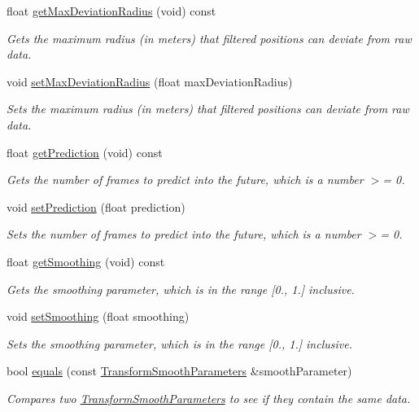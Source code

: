 \begin{DoxyCompactItemize}
float \hyperlink{class_transform_smooth_parameters_a6b09f5bd048295602203c150850adf10}{get\-Max\-Deviation\-Radius} (void) const 
\begin{DoxyCompactList}\small\item\em \-Gets the maximum radius (in meters) that filtered positions can deviate from raw data. \end{DoxyCompactList}\item 
void \hyperlink{class_transform_smooth_parameters_af60738964718dfef02ece5348e14c643}{set\-Max\-Deviation\-Radius} (float max\-Deviation\-Radius)
\begin{DoxyCompactList}\small\item\em \-Sets the maximum radius (in meters) that filtered positions can deviate from raw data. \end{DoxyCompactList}\item 
float \hyperlink{class_transform_smooth_parameters_aa2b0ade446dbda673507143b62441d95}{get\-Prediction} (void) const 
\begin{DoxyCompactList}\small\item\em \-Gets the number of frames to predict into the future, which is a number $>$= 0. \end{DoxyCompactList}\item 
void \hyperlink{class_transform_smooth_parameters_a0c919ee5d408b03b6e74e182d8a0fe07}{set\-Prediction} (float prediction)
\begin{DoxyCompactList}\small\item\em \-Sets the number of frames to predict into the future, which is a number $>$= 0. \end{DoxyCompactList}\item 
float \hyperlink{class_transform_smooth_parameters_a024d8cbaea387ac5e2b362bda987492e}{get\-Smoothing} (void) const 
\begin{DoxyCompactList}\small\item\em \-Gets the smoothing parameter, which is in the range \mbox{[}0., 1.\mbox{]} inclusive. \end{DoxyCompactList}\item 
void \hyperlink{class_transform_smooth_parameters_a9ea3bcff656194ee00acd6c9732dbfaa}{set\-Smoothing} (float smoothing)
\begin{DoxyCompactList}\small\item\em \-Sets the smoothing parameter, which is in the range \mbox{[}0., 1.\mbox{]} inclusive. \end{DoxyCompactList}\item 
bool \hyperlink{class_transform_smooth_parameters_a112f925100c3eec2fd3104edbe84c3d4}{equals} (const \hyperlink{class_transform_smooth_parameters}{\-Transform\-Smooth\-Parameters} \&smooth\-Parameter)
\begin{DoxyCompactList}\small\item\em \-Compares two \hyperlink{class_transform_smooth_parameters}{\-Transform\-Smooth\-Parameters} to see if they contain the same data. \end{DoxyCompactList}\end{DoxyCompactItemize}


